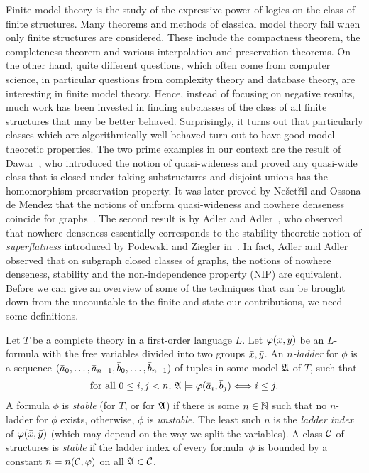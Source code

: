 Finite model theory is the study of the expressive power 
of logics on the class of finite structures. Many theorems and 
methods of classical model theory fail when only finite structures 
are considered. These include the compactness theorem, the completeness 
theorem and various interpolation and preservation theorems.
On the other hand, quite different questions, which often come from
computer science, in particular questions from complexity theory and database
theory, are interesting in finite model theory. Hence, instead of focusing 
on negative results, much work has been invested in finding 
subclasses of the class of all finite structures that may be better behaved.
Surprisingly, it turns out that particularly classes which are 
algorithmically well-behaved turn out to have good model-theoretic 
properties. The two prime examples in our context are the result of 
Dawar~\cite{dawar2010homomorphism}, who introduced the notion of
quasi-wideness and proved any quasi-wide class that is closed under taking substructures
and disjoint unions has the homomorphism preservation property. It was 
later proved by Ne\v{s}et\v{r}il and Ossona de Mendez that 
the notions of uniform quasi-wideness and nowhere denseness coincide for 
graphs~\cite{nevsetvril2011nowhere}. The second result is by 
Adler and Adler~\cite{adler2014interpreting}, who observed that 
nowhere denseness essentially corresponds to the stability theoretic notion 
of \emph{superflatness} introduced by Podewski and 
Ziegler in~\cite{podewski1978stable}. In fact, Adler and Adler observed 
that on subgraph closed classes of graphs, the notions of nowhere denseness, 
stability and the non-independence property (NIP) are equivalent. 
Before we can give an 
overview of some of the techniques that can be brought down from 
the uncountable to the finite and state our contributions, we need some
definitions. 

\begin{definition}
Let $T$ be a complete theory in a first-order language $L$. Let 
$\varphi(\bar{x},\bar{y})$ be an $L$-formula with the free variables
divided into two groups $\bar{x}, \bar{y}$. An \emph{$n$-ladder}
for $\phi$ is a sequence $(\bar{a}_0,\ldots, \bar{a}_{n-1},
\bar{b}_0,\ldots, \bar{b}_{n-1})$ of tuples in some model $\mathfrak{A}$
of $T$, such that
\[\text{for all $0\leq i,j<n$, }\mathfrak{A}\models\varphi(\bar{a}_i,\bar{b}_j)\Longleftrightarrow i\leq j. \]
A formula $\phi$ is \emph{stable} (for $T$, or for $\mathfrak{A}$) if there is 
some $n\in \mathbb{N}$ such that no $n$-ladder for $\phi$ exists, otherwise, 
$\phi$ is \emph{unstable}. The least such $n$ is the \emph{ladder index}
of $\varphi(\bar{x},\bar{y})$ (which may depend on the way we split the
variables). A class $\mathcal{C}$ of structures is \emph{stable} if the ladder index
of every formula~$\phi$ is bounded by a constant $n=n(\mathcal{C},\varphi)$
on all $\mathfrak{A}\in \mathcal{C}$.
\end{definition}

